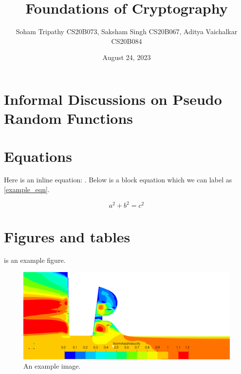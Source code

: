 \documentclass{article}
\title{Foundations of Cryptography} %
\author{Soham Tripathy CS20B073, Saksham Singh CS20B067, Aditya Vaichalkar CS20B084} %
\date{August 24, 2023} %
\begin{document}

	\maketitle %
    
	\section{Informal Discussions on Pseudo Random Functions}

	\section{Equations}
	Here is an inline equation: . Below is a block equation which we can label as \eqref{example_eqn}.

	\begin{equation} 
		\label{example_eqn}
		a^2+b^2=c^2
	\end{equation}

	\section{Figures and tables}
	 is an example figure. 

	\begin{figure}[h!]
  		\includegraphics[width=\linewidth]{images/example.png}
  		\caption{An example image.}
  		\label{figtest}
	\end{figure}
\end{document}
